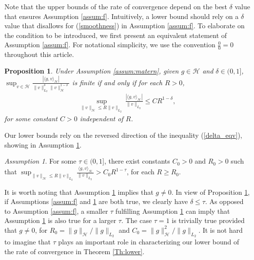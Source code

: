 \documentclass[12pt]{article}
\theoremstyle{plain}
\newtheorem{proposition}{Proposition}
\theoremstyle{remark}
\newtheorem{assumption}{Assumption}
\begin{document}
Note that the upper bounds of the rate of convergence depend on the best $\delta$ value that ensures Assumption \ref{assum:f}. Intuitively, a lower bound should rely on a $\delta$ value that disallows for (\ref{smoothness}) in Assumption \ref{assum:f}. 
To elaborate on the condition to be introduced, we first present an equivalent statement of Assumption \ref{assum:f}. For notational simplicity, we use the convention $\frac{0}{0}=0$ throughout this article. 

\begin{proposition}\label{Prop:equivalence}
    Under Assumption \ref{assum:matern}, given $g\in\mathcal{H}$ and $\delta\in(0,1]$, $\sup_{v\in\mathcal{H}}\frac{|\langle g,v\rangle_\mathcal{H}|}{\|v\|_{L_2}^\delta\|v\|^{1-\delta}_\mathcal{H}}$ is finite if and only if  for each $R>0$, 
    \begin{eqnarray}\label{delta_eqv}
        \sup_{\|v\|_\mathcal{H}\leq R\|v\|_{L_2}}\frac{|\langle g,v\rangle_\mathcal{H}|}{\|v\|_{L_2}}\leq C R^{1-\delta},
    \end{eqnarray}
    for some constant $C>0$ independent of $R$.
\end{proposition}

Our lower bounds rely on the reversed direction of the inequality (\ref{delta_eqv}), showing in Assumption \ref{assum:tau}.

\begin{assumption}\label{assum:tau}
    For some $\tau\in (0,1]$, there exist constants $C_0>0$ and $R_0>0$ such that
      $ \sup_{\|v\|_\mathcal{H}\leq R\|v\|_{L_2}}\frac{\langle g,v\rangle_\mathcal{H}}{\|v\|_{L_2}}> C_0 R^{1-\tau}$,
    for each $R\geq R_0$.
\end{assumption}

It is worth noting that Assumption \ref{assum:tau} implies that $g\neq 0$.
In view of Proposition \ref{Prop:equivalence}, if Assumptions \ref{assum:f} and \ref{assum:tau} are both true, we clearly have $\delta\leq \tau$. As opposed to Assumption \ref{assum:f}, a smaller $\tau$ fulfilling Assumption \ref{assum:tau} can imply that Assumption \ref{assum:tau} is also true for a larger $\tau$. The case $\tau=1$ is trivially true provided that $g\neq 0$, for $R_0= \|g\|_\mathcal{H}/\|g\|_{L_2}$ and $C_0=\|g\|^2_\mathcal{H}/\|g\|_{L_2}$. It is not hard to imagine that $\tau$ plays an important role in characterizing our lower bound of the rate of convergence in Theorem \ref{Th:lower}.
\end{document}

